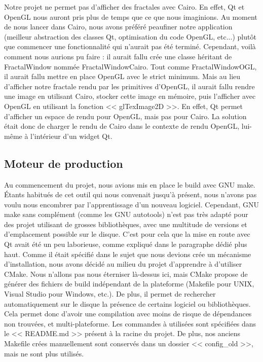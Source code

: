 \documentclass[11pt]{article}
\begin{document}
Notre projet ne permet pas d'afficher des fractales avec Cairo. En effet, Qt et
OpenGL nous auront pris plus de temps que ce que nous imaginions. Au moment de
nous lancer dans Cairo, nous avons préféré peaufiner notre application
(meilleur abstraction des classes Qt, optimisation du code OpenGL, etc...)
plutôt que commencer une fonctionnalité qui n'aurait pas été terminé. Cependant,
voilà comment nous aurions pu faire : il aurait fallu crée une classe héritant
de FractalWindow nommée FractalWindowCairo. Tout comme FractalWindowOGL, il
aurait fallu mettre en place OpenGL avec le strict minimum. Mais au lieu
d'afficher notre fractale rendu par les primitives d'OpenGL, il aurait fallu
rendre une image en utilisant Cairo, stocker cette image en mémoire, puis
l'afficher avec OpenGL en utilisant la fonction << glTexImage2D >>. En effet, Qt
permet d'afficher un espace de rendu pour OpenGL, mais pas pour Cairo. La
solution était donc de charger le rendu de Cairo dans le contexte de rendu
OpenGL, lui-même à l'intérieur d'un widget Qt.

\subsection{Moteur de production}

Au commencement du projet, nous avions mis en place le build avec GNU make.
Étants habitués de cet outil qui nous convenait jusqu'à présent, nous n'avons
pas voulu nous encombrer par l'apprentissage d'un nouveau logiciel. Cependant,
GNU make sans complément (comme les GNU autotools) n'est pas très adapté pour
des projet utilisant de grosses bibliothèques, avec une multitude de versions et
d'emplacement possible sur le disque. C'est pour cela que la mise en route avec
Qt avait été un peu laborieuse, comme expliqué dans le paragraphe dédié plus
haut. Comme il était spécifié dans le sujet que nous devions crée un mécanisme
d'installation, nous avons décidé au milieu du projet d'apprendre à d'utiliser
CMake. Nous n'allons pas nous éterniser là-dessus ici, mais CMake propose de
générer des fichiers de build indépendant de la plateforme (Makefile pour UNIX,
Visual Studio pour Windows, etc.). De plus, il permet de rechercher
automatiquement sur le disque la présence de certains logiciel ou bibliothèques.
Cela permet donc d'avoir une compilation avec moins de risque de dépendances non
trouvées, et multi-plateforme. Les commandes à utilisées sont spécifiées dans le
<< README.md >> présent à la racine du projet. De plus, nos anciens Makefile
crées manuellement sont conservés dans un dossier << config\_old >>, mais ne
sont plus utilisés.
\end{document}
